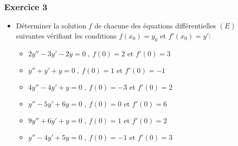\documentclass[12pt]{article}
\begin{document}
\subsubsection*{Exercice 3}
\begin{itemize}
    \item Déterminer la solution \(f\) de chacune des équations différentielles \((E)\) suivantes vérifiant les conditions \(f(x_{0})=y_{0}\text{ et }f'(x_{0})=y'\):
    \begin{itemize}
        \item \(2y''-3y'-2y=0\;,\ f(0)=2\text{ et }f'(0)=3\)
        \item \(y''+y'+y=0\;,\ f(0)=1\text{ et }f'(0)=-1\)
        \item \(4y''-4y'+y=0\;,\ f(0)=-3\text{ et }f'(0)=2\)
        \item \(y''-5y'+6y=0\;,\ f(0)=0\text{ et }f'(0)=6\)
        \item \(9y''+6y'+y=0\;,\ f(0)=1\text{ et }f'(0)=2\)
        \item \(y''-4y'+5y=0\;,\ f(0)=-1\text{ et }f'(0)=3\)
    \end{itemize}
\end{itemize}
\end{document}
